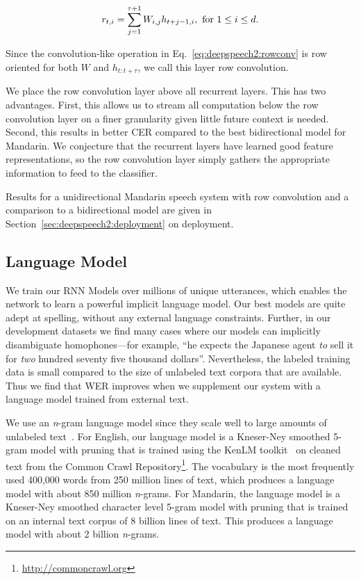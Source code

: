 \begin{align}
\label{eq:deepspeech2:rowconv}
r_{t,i} = \sum_{j=1}^{\tau+1} W_{i,j} h_{t+j-1, i}, {\rm \ for\ } 1 \leq i \leq d.
\end{align}

Since the convolution-like operation in Eq.~\ref{eq:deepspeech2:rowconv} is row
oriented for both $W$ and $h_{t:t+\tau}$, we call this layer row convolution.

We place the row convolution layer above all recurrent layers. This has two
advantages. First, this allows us to stream all computation below the row
convolution layer on a finer granularity given little future context is needed.
Second, this results in better CER compared to the best bidirectional model for
Mandarin. We conjecture that the recurrent layers have learned good feature
representations, so the row convolution layer simply gathers the appropriate
information to feed to the classifier. 

Results for a unidirectional Mandarin speech system with row convolution and a
comparison to a bidirectional model are given in
Section~\ref{sec:deepspeech2:deployment} on deployment. 

\subsection{Language Model}
\label{sec:deepspeech2:languagemodel}

We train our RNN Models over millions of unique utterances, which enables the
network to learn a powerful implicit language model. Our best models are quite
adept at spelling, without any external language constraints. Further, in our
development datasets we find many cases where our models can implicitly
disambiguate homophones---for example, ``he expects the Japanese agent
\emph{to} sell it for \emph{two} hundred seventy five thousand dollars''.
Nevertheless, the labeled training data is small compared to the size of
unlabeled text corpora that are available. Thus we find that WER improves when
we supplement our system with a language model trained from external text. 

We use an \emph{n}-gram language model since they scale well to large amounts
of unlabeled text~\cite{hannun2014deepspeech}. For English, our language model
is a Kneser-Ney smoothed 5-gram model with pruning that is trained using the
KenLM toolkit~\cite{heafield2013} on cleaned text from the Common Crawl
Repository\footnote{\url{http://commoncrawl.org}}. The vocabulary is the most
frequently used 400,000 words from 250 million lines of text, which produces a
language model with about 850 million \emph{n}-grams. For Mandarin, the
language model is a Kneser-Ney smoothed character level 5-gram model with
pruning that is trained on an internal text corpus of 8 billion lines of text.
This produces a language model with about 2 billion \emph{n}-grams.

